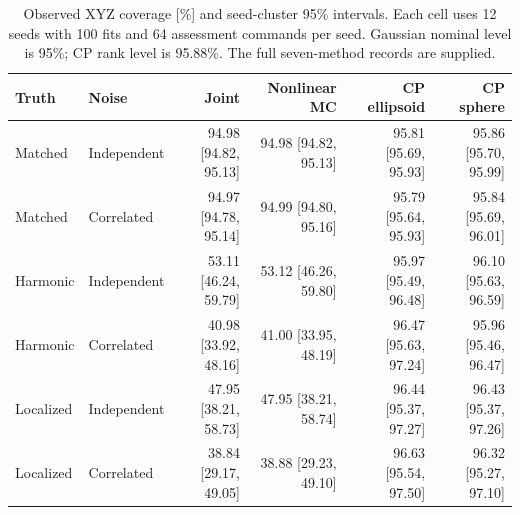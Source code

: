 \begin{table}[H]\centering\scriptsize
\setlength{\tabcolsep}{3pt}
\begin{tabular}{llrrrr}\toprule
Truth & Noise & Joint & Nonlinear MC & CP ellipsoid & CP sphere\\\midrule
Matched & Independent & 94.98 [94.82, 95.13] & 94.98 [94.82, 95.13] & 95.81 [95.69, 95.93] & 95.86 [95.70, 95.99]\\
Matched & Correlated & 94.97 [94.78, 95.14] & 94.99 [94.80, 95.16] & 95.79 [95.64, 95.93] & 95.84 [95.69, 96.01]\\
Harmonic & Independent & 53.11 [46.24, 59.79] & 53.12 [46.26, 59.80] & 95.97 [95.49, 96.48] & 96.10 [95.63, 96.59]\\
Harmonic & Correlated & 40.98 [33.92, 48.16] & 41.00 [33.95, 48.19] & 96.47 [95.63, 97.24] & 95.96 [95.46, 96.47]\\
Localized & Independent & 47.95 [38.21, 58.73] & 47.95 [38.21, 58.74] & 96.44 [95.37, 97.27] & 96.43 [95.37, 97.26]\\
Localized & Correlated & 38.84 [29.17, 49.05] & 38.88 [29.23, 49.10] & 96.63 [95.54, 97.50] & 96.32 [95.27, 97.10]\\
\bottomrule\end{tabular}
\caption{Observed XYZ coverage [\%] and seed-cluster 95\% intervals. Each cell uses 12 seeds with 100 fits and 64 assessment commands per seed. Gaussian nominal level is 95\%; CP rank level is 95.88\%. The full seven-method records are supplied.}\label{tab:auditcoverage}
\end{table}

